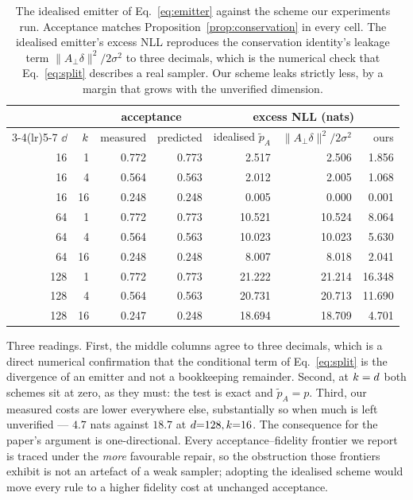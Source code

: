 \begin{table}[h]
\centering
\small
\caption{The idealised emitter of Eq.~\ref{eq:emitter} against the scheme our experiments run.
Acceptance matches Proposition~\ref{prop:conservation} in every cell. The idealised emitter's excess
NLL reproduces the conservation identity's leakage term $\|A_\perp\delta\|^2/2\sigma^2$ to three
decimals, which is the numerical check that Eq.~\ref{eq:split} describes a real sampler. Our scheme
leaks strictly less, by a margin that grows with the unverified dimension.}
\label{tab:emitter}
\begin{tabular}{rr rr rrr}
\toprule
& & \multicolumn{2}{c}{acceptance} & \multicolumn{3}{c}{excess NLL (nats)} \\
\cmidrule(lr){3-4}\cmidrule(lr){5-7}
$\dd$ & $k$ & measured & predicted & idealised $\tilde{p}_A$ & $\|A_\perp\delta\|^2/2\sigma^2$ & ours \\
\midrule
 16 &  1 & 0.772 & 0.773 &  2.517 &  2.506 & 1.856 \\
 16 &  4 & 0.564 & 0.563 &  2.012 &  2.005 & 1.068 \\
 16 & 16 & 0.248 & 0.248 &  0.005 &  0.000 & 0.001 \\
\midrule
 64 &  1 & 0.772 & 0.773 & 10.521 & 10.524 & 8.064 \\
 64 &  4 & 0.564 & 0.563 & 10.023 & 10.023 & 5.630 \\
 64 & 16 & 0.248 & 0.248 &  8.007 &  8.018 & 2.041 \\
\midrule
128 &  1 & 0.772 & 0.773 & 21.222 & 21.214 & 16.348 \\
128 &  4 & 0.564 & 0.563 & 20.731 & 20.713 & 11.690 \\
128 & 16 & 0.247 & 0.248 & 18.694 & 18.709 & 4.701 \\
\bottomrule
\end{tabular}
\end{table}

Three readings. First, the middle columns agree to three decimals, which is a direct numerical
confirmation that the conditional term of Eq.~\ref{eq:split} is the divergence of an emitter and not
a bookkeeping remainder. Second, at $k = d$ both schemes sit at zero, as they must: the test is
exact and $\tilde{p}_A = p$. Third, our measured costs are lower everywhere else, substantially so
when much is left unverified --- $4.7$ nats against $18.7$ at $d{=}128, k{=}16$. The consequence
for the paper's argument is one-directional. Every acceptance--fidelity frontier we report is traced
under the \emph{more} favourable repair, so the obstruction those frontiers exhibit is not an
artefact of a weak sampler; adopting the idealised scheme would move every rule to a higher fidelity
cost at unchanged acceptance.

